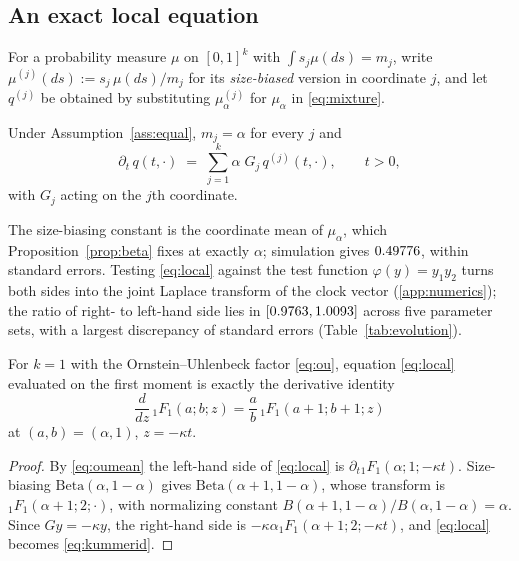 \documentclass{ws-ijtaf}
\newcommand{\Bet}{\mathrm{Beta}}
\newcommand{\Fone}{{}_1F_1}
\begin{document}
\subsection{An exact local equation}

For a probability measure $\mu$ on $[0,1]^k$ with $\int s_j\mu(ds)=m_j$, write
$\mu^{(j)}(ds) := s_j\,\mu(ds)/m_j$ for its \emph{size-biased} version in
coordinate $j$, and let $q^{(j)}$ be obtained by substituting
$\mu_\alpha^{(j)}$ for $\mu_\alpha$ in \eqref{eq:mixture}.

\begin{theorem}\label{thm:local}
Under Assumption~\ref{ass:equal}, $m_j=\alpha$ for every $j$ and
\begin{equation}
\partial_t\, q(t,\cdot) \;=\; \sum_{j=1}^{k}\alpha\; G_j\, q^{(j)}(t,\cdot),
\qquad t>0 ,
\label{eq:local}
\end{equation}
with $G_j$ acting on the $j$th coordinate.
\end{theorem}

The size-biasing constant is the coordinate mean of $\mu_\alpha$, which
Proposition~\ref{prop:beta} fixes at exactly $\alpha$; simulation gives
$0.49776$, within \sizeBiasZ{} standard errors. Testing \eqref{eq:local}
against the test function $\varphi(y)=y_1y_2$ turns both sides into the joint
Laplace transform of the clock vector (\ref{app:numerics}); the ratio
of right- to left-hand side lies in $[0.9763, 1.0093]$ across five
parameter sets, with a largest discrepancy of \localMaxZ{} standard errors
(Table~\ref{tab:evolution}).

\begin{proposition}\label{prop:kummer}
For $k=1$ with the Ornstein--Uhlenbeck factor \eqref{eq:ou}, equation
\eqref{eq:local} evaluated on the first moment is exactly the derivative
identity
\begin{equation}
\frac{d}{dz}\,\Fone(a;b;z) = \frac{a}{b}\,\Fone(a+1;b+1;z)
\label{eq:kummerid}
\end{equation}
at $(a,b)=(\alpha,1)$, $z=-\kappa t$.
\end{proposition}

\begin{proof}
By \eqref{eq:oumean} the left-hand side of \eqref{eq:local} is
$\partial_t \Fone(\alpha;1;-\kappa t)$. Size-biasing $\Bet(\alpha,1-\alpha)$
gives $\Bet(\alpha+1,1-\alpha)$, whose transform is $\Fone(\alpha+1;2;\cdot)$,
with normalizing constant $B(\alpha+1,1-\alpha)/B(\alpha,1-\alpha)=\alpha$.
Since $Gy=-\kappa y$, the right-hand side is
$-\kappa\alpha\Fone(\alpha+1;2;-\kappa t)$, and \eqref{eq:local} becomes
\eqref{eq:kummerid}.
\end{proof}
\end{document}
